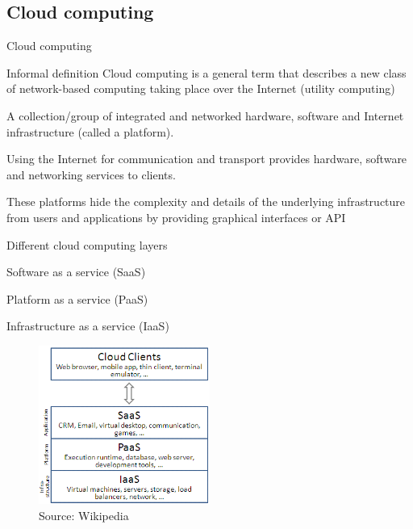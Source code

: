 \subsection{Cloud computing}

\begin{frame}{Cloud computing}

\begin{block}{Informal definition}	
Cloud computing is a general term that describes a new class of network-based 
computing taking place over the Internet (\alert{utility computing})
\end{block}
\medskip
\BI
\item A collection/group of integrated and networked hardware, software and Internet infrastructure (called a platform).
\item Using the Internet for communication and transport provides hardware, software and networking services to clients.
\item These platforms hide the complexity and details of the underlying infrastructure from users and applications by 
providing graphical interfaces or API
\EI
\end{frame}

\begin{frame}{Different cloud computing layers}
\BI
\item Software as a service (SaaS)
\item Platform as a service (PaaS)
\item Infrastructure as a service (IaaS)
\EI

\begin{figure}
\includegraphics[width=0.5\textwidth]{figs/02/cloud_computing_layers.png}	
\caption{Source: Wikipedia}
\end{figure}


\end{frame}

